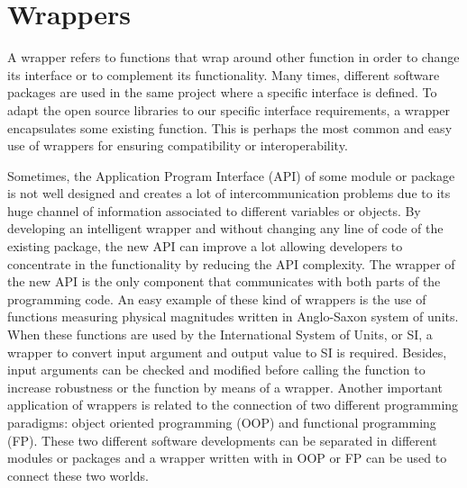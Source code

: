 \newpage 
    \section{Wrappers} 
A wrapper refers to functions 
that wrap around other function in order to change its interface or to complement 
its functionality. 
Many times, different software packages are used in the same project where a specific 
interface is defined. To adapt the open source libraries to our specific interface 
requirements, a wrapper encapsulates some existing function. 
This is perhaps the most common and easy use of wrappers for ensuring compatibility or 
interoperability. 

Sometimes, the Application Program Interface (API) of some module or package 
is not well designed and creates a lot of intercommunication problems due to its 
huge channel of information associated to different variables or objects. 
By developing an intelligent wrapper and without changing any line of code 
of the existing package, the new API can improve a lot allowing developers to concentrate
in the functionality by reducing the API complexity.  The wrapper of the new API 
is the only component that communicates  with both parts of the programming code.
An easy example of these kind of wrappers is the use of functions 
measuring physical magnitudes written in Anglo-Saxon system of units. 
When these functions are used by the  International System of Units, or SI, a wrapper 
to convert input argument and output value to SI is required. 
Besides, input arguments can be checked and modified before calling the function to increase robustness
or the function by means of a wrapper. 
Another important application of wrappers is related to the connection of two different programming 
paradigms: object oriented programming (OOP) and functional programming (FP). 
These two different software developments can be separated in different modules or packages 
and a wrapper written with in OOP or FP can be used to connect these two worlds. 



